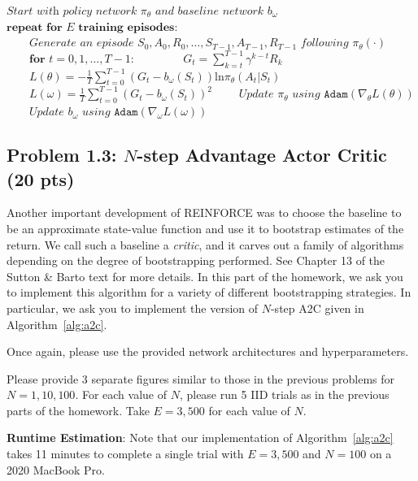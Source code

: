 \documentclass[12pt]{article}
\begin{document}
\begin{algorithm}[H]
\caption{REINFORCE with Baseline\label{alg:reinforce-baseline}}
\begin{algorithmic}[1]
\State $\textit{Start with policy network } \pi_\theta \textit{ and baseline network } b_{\omega}$
\State $\textbf{repeat for $E$ training episodes:}$
\State $\qquad\textit{Generate an episode } S_0, A_0, R_0, \ldots, S_{T-1}, A_{T-1}, R_{T-1} \textit{ following } \pi_\theta(\cdot)$
\State $\qquad\textbf{for } t = 0 , 1 , \dots , T-1 $: \label{line:reinforce-baseline:1}
\State $\qquad\qquad G_t = \sum_{k=t}^{T-1} \gamma^{k-t} R_{k}$ \label{line:reinforce-baseline:2}
\State $\qquad L(\theta) = -\frac{1}{T} \sum_{t=0}^{T-1} (G_t-b_{\omega}(S_t)) \text{ln} \pi_\theta(A_t | S_t)$
\State $\qquad L(\omega) = \frac{1}{T} \sum_{t=0}^{T-1} (G_t - b_{\omega}(S_t))^2 $
\State $\qquad\textit{Update $\pi_\theta$ using } \texttt{Adam}\left(\nabla_\theta L(\theta)\right)$
\State $\qquad\textit{Update $b_\omega$ using } \texttt{Adam}\left(\nabla_\omega L(\omega)\right)$
\EndProcedure
\end{algorithmic}
\end{algorithm}

\subsection*{Problem 1.3: $N$-step Advantage Actor Critic (20 pts)}
Another important development of REINFORCE was to choose the baseline to be an approximate state-value function and use it to bootstrap estimates of the return. We call such a baseline a \textit{critic}, and it carves out a family of algorithms depending on the degree of bootstrapping performed. See Chapter 13 of the Sutton \& Barto text for more details. In this part of the homework, we ask you to implement this algorithm for a variety of different bootstrapping strategies. In particular, we ask you to implement the version of $N$-step A2C given in Algorithm~\ref{alg:a2c}.

Once again, please use the provided network architectures and hyperparameters. 

Please provide 3 separate figures similar to those in the previous problems for $N=1, 10, 100$. For each value of $N$, please run 5 IID trials as in the previous parts of the homework. Take $E=3,500$ for each value of $N$.

\textbf{Runtime Estimation}: Note that our implementation of Algorithm~\ref{alg:a2c} takes 11 minutes to complete a single trial with $E=3,500$ and $N=100$ on a 2020 MacBook Pro.
\end{document}
